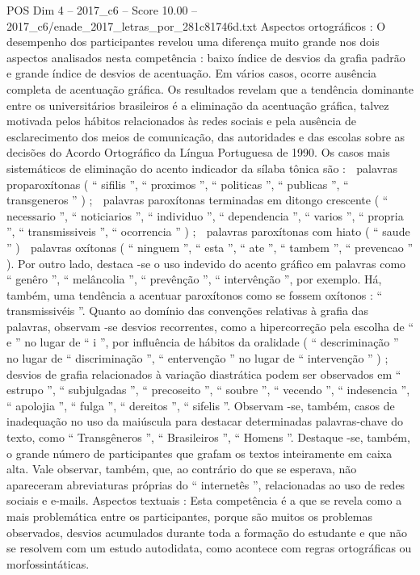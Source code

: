 \begin{textsample}{POS Dim 4 – 2017\_c6 – Score 10.00 – 2017\_c6/enade\_2017\_letras\_por\_281c81746d.txt}
Aspectos ortográficos : O desempenho dos participantes revelou uma diferença muito grande nos dois aspectos analisados nesta competência : baixo índice de desvios da grafia padrão e grande índice de desvios de acentuação.
Em vários casos, ocorre ausência completa de acentuação gráfica.
Os resultados revelam que a tendência dominante entre os universitários brasileiros é a eliminação da acentuação gráfica, talvez motivada pelos hábitos relacionados às redes sociais e pela ausência de esclarecimento dos meios de comunicação, das autoridades e das escolas sobre as decisões do Acordo Ortográfico da Língua Portuguesa de 1990.
Os casos mais sistemáticos de eliminação do acento indicador da sílaba tônica são :  palavras proparoxítonas ( “ sifilis ”, “ proximos ”, “ politicas ”, “ publicas ”, “ transgeneros ” ) ;  palavras paroxítonas terminadas em ditongo crescente ( “ necessario ”, “ noticiarios ”, “ individuo ”, “ dependencia ”, “ varios ”, “ propria ”, “ transmissiveis ”, “ ocorrencia ” ) ;  palavras paroxítonas com hiato ( “ saude ” )  palavras oxítonas ( “ ninguem ”, “ esta ”, “ ate ”, “ tambem ”, “ prevencao ” ).
Por outro lado, destaca -se o uso indevido do acento gráfico em palavras como “ genêro ”, “ melâncolia ”, “ prevênção ”, “ intervênção ”, por exemplo.
Há, também, uma tendência a acentuar paroxítonos como se fossem oxítonos : “ transmissivéis ”.
Quanto ao domínio das convenções relativas à grafia das palavras, observam -se desvios recorrentes, como a hipercorreção pela escolha de “ e ” no lugar de “ i ”, por influência de hábitos da oralidade ( “ descriminação ” no lugar de “ discriminação ”, “ entervenção ” no lugar de “ intervenção ” ) ; desvios de grafia relacionados à variação diastrática podem ser observados em “ estrupo ”, “ subjulgadas ”, “ precoseito ”, “ soubre ”, “ vecendo ”, “ indesencia ”, “ apolojia ”, “ fulga ”, “ dereitos ”, “ sifelis ”.
Observam -se, também, casos de inadequação no uso da maiúscula para destacar determinadas palavras-chave do texto, como “ Transgêneros ”, “ Brasileiros ”, “ Homens ”.
Destaque -se, também, o grande número de participantes que grafam os textos inteiramente em caixa alta.
Vale observar, também, que, ao contrário do que se esperava, não apareceram abreviaturas próprias do “ internetês ”, relacionadas ao uso de redes sociais e e-mails.
Aspectos textuais : Esta competência é a que se revela como a mais problemática entre os participantes, porque são muitos os problemas observados, desvios acumulados durante toda a formação do estudante e que não se resolvem com um estudo autodidata, como acontece com regras ortográficas ou morfossintáticas.

\end{textsample}
